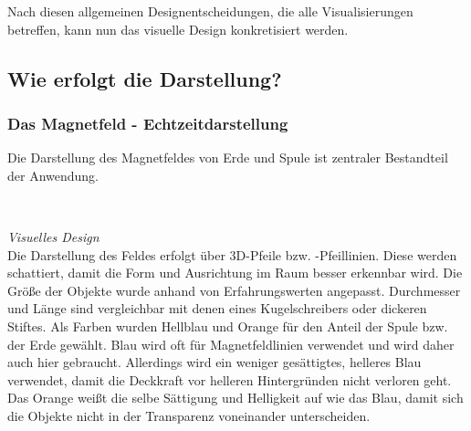 Nach diesen allgemeinen Designentscheidungen, die alle Visualisierungen betreffen, kann nun das visuelle Design konkretisiert werden.

\subsection{Wie erfolgt die Darstellung?}

\subsubsection{Das Magnetfeld - Echtzeitdarstellung}
\label{sec-4-2-2}
Die Darstellung des Magnetfeldes von Erde und Spule ist zentraler Bestandteil der Anwendung.

\vspace{4px}
\begin{center}
	\\
\end{center}
\vspace{6px}

\textit{Visuelles Design}\\
Die Darstellung des Feldes erfolgt über 3D-Pfeile bzw. -Pfeillinien. Diese werden schattiert, damit die Form und Ausrichtung im Raum besser erkennbar wird. Die Größe der Objekte wurde anhand von Erfahrungswerten angepasst. Durchmesser und Länge sind vergleichbar mit denen eines Kugelschreibers oder dickeren Stiftes. Als Farben wurden Hellblau und Orange für den Anteil der Spule bzw. der Erde gewählt. Blau wird oft für Magnetfeldlinien verwendet und wird daher auch hier gebraucht. Allerdings wird ein weniger gesättigtes, helleres Blau verwendet, damit die Deckkraft vor helleren Hintergründen nicht verloren geht. Das Orange weißt die selbe Sättigung und Helligkeit auf wie das Blau, damit sich die Objekte nicht in der Transparenz voneinander unterscheiden.\\

